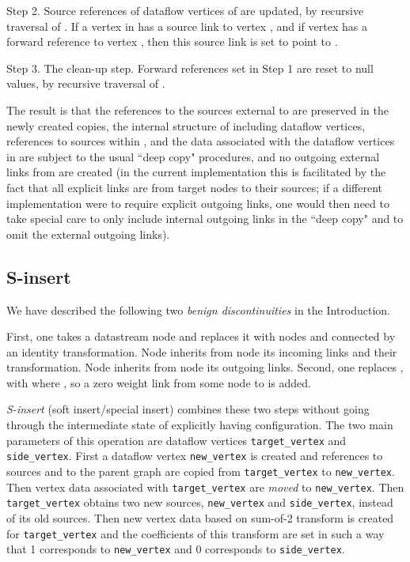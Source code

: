 \documentclass{llncs}
\begin{document}
Step 2. Source references of dataflow vertices of  are updated, by recursive traversal of . If a vertex  in  has a source
link to vertex , and if vertex  has
a forward reference to vertex , then this source link is set to point to .

Step 3. The clean-up step.  Forward references set in Step 1 are reset to null values, by recursive traversal of .

The result is that the references to the sources external to  are preserved in the newly created copies, the internal structure of  including dataflow vertices, 
references to sources within , and the data associated with the dataflow vertices in  are subject to the usual ``deep copy"
procedures, and no outgoing external links from  are created (in the current implementation this is facilitated by the fact that all explicit links
are from target nodes to their sources; if a different implementation were to require explicit outgoing links, one would then need to take
special care to only include internal outgoing links in the ``deep copy" and to omit the external outgoing links).  


\subsection{S-insert}\label{special_insert}

We have described the following two {\em benign discontinuities} in the Introduction.

 First,
one takes a datastream node  and replaces it with nodes  and  connected by an identity transformation. Node  inherits from node  its
incoming links and their transformation. Node  inherits from node  its outgoing links. Second, one replaces , with
 where , so a zero weight link from some node  to  is added. 

{\em S-insert} (soft insert/special insert) combines these two steps without going through the intermediate state of explicitly having  configuration. The two main
parameters of this operation are dataflow vertices {\tt target\_vertex} and {\tt side\_vertex}. First a dataflow vertex {\tt new\_vertex} is created
and references to sources and to the parent graph are copied from {\tt target\_vertex} to  {\tt new\_vertex}. Then vertex data associated with
{\tt target\_vertex} are {\em moved} to {\tt new\_vertex}. Then {\tt target\_vertex} obtains two new sources,  
{\tt new\_vertex} and {\tt side\_vertex}, instead of its old sources. Then new vertex data based on sum-of-2 transform is created for
{\tt target\_vertex} and the coefficients of this transform are set in such a way that 1 corresponds to {\tt new\_vertex}
and 0 corresponds to {\tt side\_vertex}.
\end{document}
